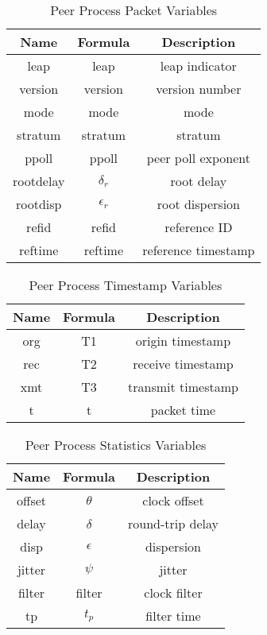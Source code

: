 \begin{table}[htb]
\center
\begin{tabular}{c | c | c}
Name & Formula & Description \\
\hline
\hline
leap & leap & leap indicator \\
version & version & version number \\
mode & mode & mode \\
stratum & stratum & stratum \\
ppoll & ppoll & peer poll exponent \\
rootdelay & $ \delta_r $ & root delay \\
rootdisp & $ \epsilon_r $ & root dispersion \\
refid & refid & reference ID \\
reftime & reftime & reference timestamp \\
\hline
\end{tabular}
\label{peer_process_packet_variables}
\caption{Peer Process Packet Variables}
\end{table}

\begin{table}[htb]
\center
\begin{tabular}{c | c | c}
Name & Formula & Description \\
\hline
\hline
org & T1 & origin timestamp \\
rec & T2 & receive timestamp \\
xmt & T3 & transmit timestamp \\
t & t & packet time \\
\hline
\end{tabular}
\label{peer_process_timestamp_variables}
\caption{Peer Process Timestamp Variables}
\end{table}

\begin{table}[htb]
\center
\begin{tabular}{c | c | c}
Name & Formula & Description \\
\hline
\hline
offset & $ \theta $ & clock offset \\
delay & $ \delta $ & round-trip delay\\
disp & $ \epsilon $ & dispersion \\
jitter & $ \psi $ & jitter \\
filter & filter & clock filter \\
tp & $ t_p $ & filter time \\
\hline
\end{tabular}
\label{peer_process_statistics_variables}
\caption{Peer Process Statistics Variables}
\end{table}

